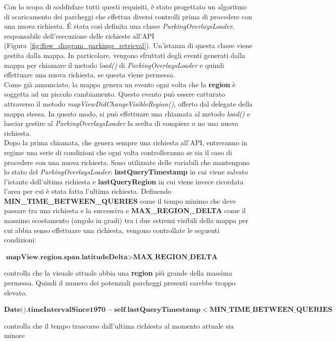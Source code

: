 Con lo scopo di soddisfare tutti questi requisiti, è stato progettato un algoritmo di 
scaricamento dei parcheggi che effettua diversi controlli prima di procedere con una 
nuova richiesta. \'E stata così definita una classe \emph{ParkingOverlaysLoader}, 
responsabile dell'esecuzione delle richieste all'API
(Figura~\ref{fig:flow_diagram_parkings_retrieval}). Un'istanza di questa classe
viene gestita dalla mappa. In particolare, vengono sfruttati degli eventi generati
dalla mappa per chiamare il metodo \emph{load()} di \emph{ParkingOverlaysLoader} e
quindi effettuare una nuova richiesta, se questa viene permessa.\\
Come già annunciato, la mappa genera un evento ogni volta che la \textbf{region} è 
soggetta ad un piccolo cambiamento. Questo evento può essere catturato attraverso
il metodo \emph{mapViewDidChangeVisibleRegion()}, offerto dal delegate della mappa
stessa. In questo modo, si può effettuare una chiamata al metodo \emph{load()} e
lasciar gestire al \emph{ParkingOverlaysLoader} la scelta di compiere o no una
nuova richiesta.\\
Dopo la prima chiamata, che genera sempre una richiesta all'API, entreranno in regime
una serie di condizioni che ogni volta controlleranno se sia il caso di procedere con
una nuova richiesta. Sono utilizzate delle variabili che mantengono lo stato del 
\emph{ParkingOverlaysLoader}: \textbf{lastQueryTimestamp} in cui viene salvato 
l'istante dell'ultima richiesta e \textbf{lastQueryRegion} in cui viene invece 
ricordata l'area per cui è stata fatta l'ultima richiesta. Definendo 
\textbf{MIN\_TIME\_BETWEEN\_QUERIES} come il tempo minimo
che deve passare tra una richiesta e la successiva e \textbf{MAX\_REGION\_DELTA} come 
il massimo scostamento (angolo in gradi) tra i due estremi visibili della mappa per 
cui abbia senso effettuare una richiesta, vengono controllate le seguenti condizioni:
\begin{center}
    $ \textbf{mapView.region.span.latitudeDelta} > \textbf{MAX\_REGION\_DELTA} $
\end{center}
controlla che la visuale attuale abbia una \textbf{region} più grande della massima
permessa. Quindi il numero dei potenziali parcheggi presenti sarebbe troppo elevato.
\begin{center}
    $ \textbf{Date().timeIntervalSince1970} - \textbf{self.lastQueryTimestamp} < 
    \textbf{MIN\_TIME\_BETWEEN\_QUERIES} $
\end{center} 
controlla che il tempo trascorso dall'ultima richiesta al momento attuale sia minore 
